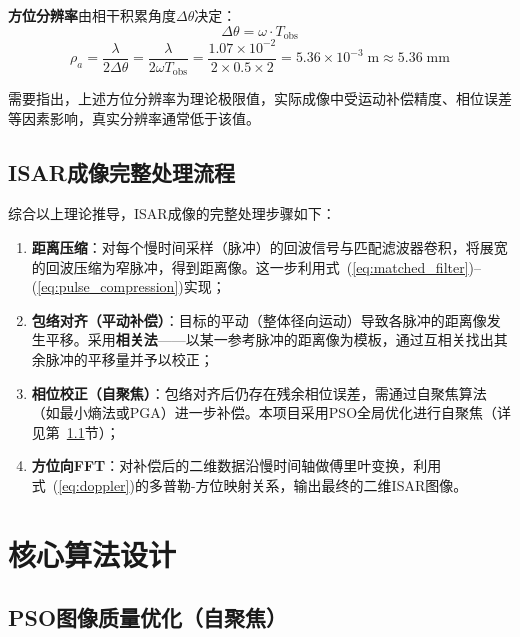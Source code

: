\documentclass[12pt, a4paper]{article}
\begin{document}
\textbf{方位分辨率}由相干积累角度$\Delta\theta$决定：
\begin{equation}
  \Delta\theta = \omega \cdot T_{\mathrm{obs}}
  \label{eq:coherent_angle}
\end{equation}
\begin{equation}
  \boxed{\rho_a = \frac{\lambda}{2\Delta\theta} = \frac{\lambda}{2\omega T_{\mathrm{obs}}}
  = \frac{1.07\times 10^{-2}}{2\times 0.5\times 2} = 5.36\times 10^{-3}\;\text{m} \approx 5.36\;\text{mm}}
  \label{eq:azimuth_res}
\end{equation}

需要指出，上述方位分辨率为理论极限值，实际成像中受运动补偿精度、相位误差等因素影响，真实分辨率通常低于该值。

\subsection{ISAR成像完整处理流程}

综合以上理论推导，ISAR成像的完整处理步骤如下：

\begin{enumerate}
  \item \textbf{距离压缩}：对每个慢时间采样（脉冲）的回波信号与匹配滤波器卷积，将展宽的回波压缩为窄脉冲，得到距离像。这一步利用式~(\ref{eq:matched_filter})--(\ref{eq:pulse_compression})实现；
  \item \textbf{包络对齐（平动补偿）}：目标的平动（整体径向运动）导致各脉冲的距离像发生平移。采用\textbf{相关法}——以某一参考脉冲的距离像为模板，通过互相关找出其余脉冲的平移量并予以校正；
  \item \textbf{相位校正（自聚焦）}：包络对齐后仍存在残余相位误差，需通过自聚焦算法（如最小熵法或PGA）进一步补偿。本项目采用PSO全局优化进行自聚焦（详见第~\ref{sec:pso}节）；
  \item \textbf{方位向FFT}：对补偿后的二维数据沿慢时间轴做傅里叶变换，利用式~(\ref{eq:doppler})的多普勒-方位映射关系，输出最终的二维ISAR图像。
\end{enumerate}

\section{核心算法设计}

\subsection{PSO图像质量优化（自聚焦）}
\label{sec:pso}
\end{document}
